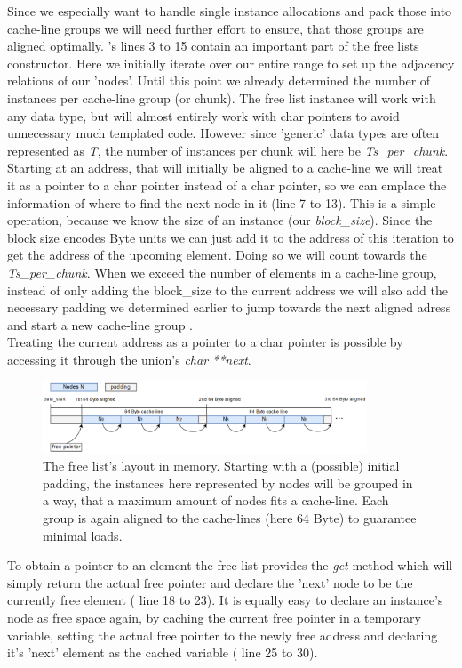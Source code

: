 Since we especially want to handle single instance allocations and pack those into cache-line groups we will need further effort to ensure, that those groups are aligned optimally. 's lines 3 to 15 contain an important part of the free lists constructor. Here we initially iterate over our entire range to set up the adjacency relations of our 'nodes'. Until this point we already determined the number of instances per cache-line group (or chunk). The free list instance will work with any data type, but will almost entirely work with char pointers to avoid unnecessary much templated code. However since 'generic' data types are often represented as \textit{T}, the number of instances per chunk will here be \textit{Ts\_per\_chunk}.\\
Starting at an address, that will initially be aligned to a cache-line we will treat it as a pointer to a char pointer instead of a char pointer, so we can emplace the information of where to find the next node in it (line 7 to 13). This is a simple operation, because we know the size of an instance (our \textit{block\_size}). Since the block size encodes Byte units we can just add it to the address of this iteration to get the address of the upcoming element. Doing so we will count towards the \textit{Ts\_per\_chunk}. When we exceed the number of elements in a cache-line group, instead of only adding the block\_size to the current address we will also add the necessary padding we determined earlier to jump towards the next aligned adress and start a new cache-line group .\\
Treating the current address as a pointer to a char pointer is possible by accessing it through the union's \textit{char **next}. 
\begin{figure}[!htbp]
	\centering
	\includegraphics[width=0.86\textwidth, height=0.3\textwidth]{PICs/free_list_in_memory}
	\caption{The free list's layout in memory. Starting with a (possible) initial padding, the instances here represented by nodes will be grouped in a way, that a maximum amount of nodes fits a cache-line. Each group is again aligned to the cache-lines (here 64 Byte) to guarantee minimal loads.}
	\label{free_list_in_memory}
\end{figure}
To obtain a pointer to an element the free list provides the \textit{get} method which will simply return the actual free pointer and declare the 'next' node to be the currently free element ( line 18 to 23). It is equally easy to declare an instance's node as free space again, by caching the current free pointer in a temporary variable, setting the actual free pointer to the newly free address and declaring it's 'next' element as the cached variable ( line 25 to 30).

